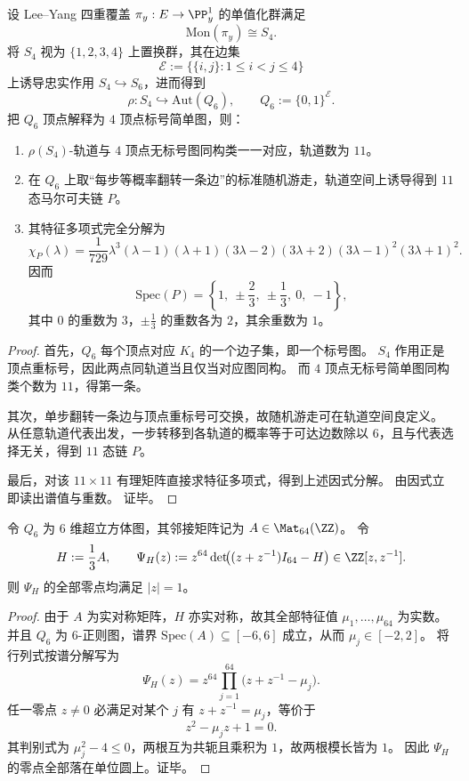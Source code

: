 \begin{conclusion}\label{con:conclusion-s4-hypercube-11state-spectrum}
设 Lee--Yang 四重覆盖 \(\pi_y:E\to\PP^1_y\) 的单值化群满足
\[
\mathrm{Mon}(\pi_y)\cong S_4.
\]
将 \(S_4\) 视为 \(\{1,2,3,4\}\) 上置换群，其在边集
\[
\mathcal E:=\{\{i,j\}:1\le i<j\le 4\}
\]
上诱导忠实作用 \(S_4\hookrightarrow S_6\)，进而得到
\[
\rho:S_4\hookrightarrow \mathrm{Aut}(Q_6),\qquad Q_6:=\{0,1\}^{\mathcal E}.
\]
把 \(Q_6\) 顶点解释为 \(4\) 顶点标号简单图，则：
\begin{enumerate}
  \item \(\rho(S_4)\)-轨道与 \(4\) 顶点无标号图同构类一一对应，轨道数为 \(11\)。
  \item 在 \(Q_6\) 上取“每步等概率翻转一条边”的标准随机游走，轨道空间上诱导得到 \(11\) 态马尔可夫链 \(P\)。
  \item 其特征多项式完全分解为
  \[
  \chi_P(\lambda)
  =
  \frac{1}{729}\lambda^3(\lambda-1)(\lambda+1)(3\lambda-2)(3\lambda+2)(3\lambda-1)^2(3\lambda+1)^2.
  \]
  因而
  \[
  \mathrm{Spec}(P)
  =
  \left\{
  1,\ \pm\frac23,\ \pm\frac13,\ 0,\ -1
  \right\},
  \]
  其中 \(0\) 的重数为 \(3\)，\(\pm\frac13\) 的重数各为 \(2\)，其余重数为 \(1\)。
\end{enumerate}
\end{conclusion}
\begin{proof}
首先，\(Q_6\) 每个顶点对应 \(K_4\) 的一个边子集，即一个标号图。
\(S_4\) 作用正是顶点重标号，因此两点同轨道当且仅当对应图同构。
而 \(4\) 顶点无标号简单图同构类个数为 \(11\)，得第一条。

其次，单步翻转一条边与顶点重标号可交换，故随机游走可在轨道空间良定义。
从任意轨道代表出发，一步转移到各轨道的概率等于可达边数除以 \(6\)，且与代表选择无关，得到 \(11\) 态链 \(P\)。

最后，对该 \(11\times 11\) 有理矩阵直接求特征多项式，得到上述因式分解。
由因式立即读出谱值与重数。
证毕。
\end{proof}

\begin{proposition}\label{prop:conclusion-q6-joukowsky-unit-circle-zero-law}
令 \(Q_6\) 为 \(6\) 维超立方体图，其邻接矩阵记为 \(A\in\Mat_{64}(\ZZ)\)。
令
\[
H:=\frac13 A,
\qquad
\Psi_H(z):=z^{64}\det\!\bigl((z+z^{-1})I_{64}-H\bigr)\in\ZZ[z,z^{-1}].
\]
则 \(\Psi_H\) 的全部零点均满足 \(|z|=1\)。
\end{proposition}
\begin{proof}
由于 \(A\) 为实对称矩阵，\(H\) 亦实对称，故其全部特征值 \(\mu_1,\dots,\mu_{64}\) 为实数。
并且 \(Q_6\) 为 \(6\)-正则图，谱界 \(\mathrm{Spec}(A)\subseteq[-6,6]\) 成立，从而 \(\mu_j\in[-2,2]\)。
将行列式按谱分解写为
\[
\Psi_H(z)=z^{64}\prod_{j=1}^{64}\bigl(z+z^{-1}-\mu_j\bigr).
\]
任一零点 \(z\neq 0\) 必满足对某个 \(j\) 有 \(z+z^{-1}=\mu_j\)，等价于
\[
z^2-\mu_j z+1=0.
\]
其判别式为 \(\mu_j^2-4\le 0\)，两根互为共轭且乘积为 \(1\)，故两根模长皆为 \(1\)。
因此 \(\Psi_H\) 的零点全部落在单位圆上。证毕。
\end{proof}

